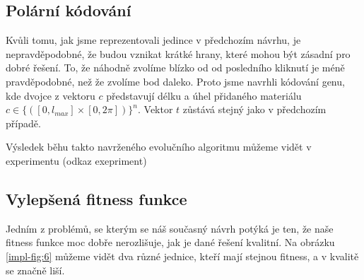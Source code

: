 \subsection{Polární kódování}

Kvůli tomu, jak jsme reprezentovali jedince v předchozím návrhu, je nepravděpodobné, že budou vznikat krátké hrany, které mohou být zásadní pro dobré řešení. To, že náhodně zvolíme blízko od od posledního kliknutí je méně pravděpodobné, než že zvolíme bod daleko. Proto jsme navrhli kódování genu, kde dvojce z vektoru $c$ představují délku a úhel přidaného materiálu $c \in \{([0, l_{max}] \times [0, 2 \pi])\}^n$. Vektor $t$ zůstává stejný jako v předchozím případě.

Výsledek běhu takto navrženého evolučního algoritmu můžeme vidět v experimentu (odkaz exepriment)

\subsection{Vylepšená fitness funkce}

Jedním z problémů, se kterým se náš současný návrh potýká je ten, že naše fitness funkce moc dobře nerozlišuje, jak je dané řešení kvalitní. Na obrázku \ref{impl-fig:6} můžeme vidět dva různé jednice, kteří mají stejnou fitness, a v kvalitě se značně liší.


